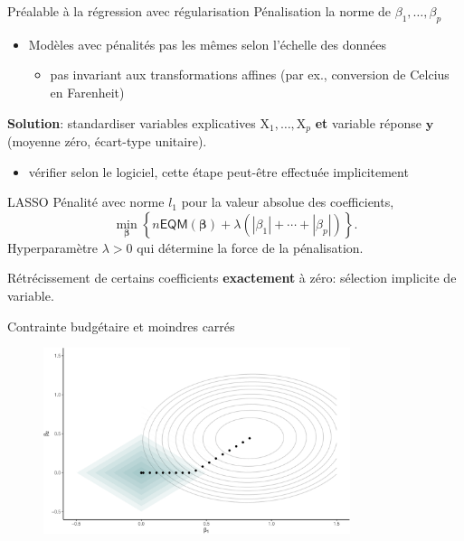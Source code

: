 \documentclass[
  ignorenonframetext,
]{beamer}
\providecommand{\tightlist}{%
  \setlength{\itemsep}{0pt}\setlength{\parskip}{0pt}}\usepackage{longtable,booktabs,array}
\begin{document}
\begin{frame}{Préalable à la régression avec régularisation}
\protect\hypertarget{pruxe9alable-uxe0-la-ruxe9gression-avec-ruxe9gularisation}{}
Pénalisation la norme de \(\beta_1, \ldots, \beta_p\)

\begin{itemize}
\tightlist
\item
  Modèles avec pénalités pas les mêmes selon l'échelle des données

  \begin{itemize}
  \tightlist
  \item
    pas invariant aux transformations affines (par ex., conversion de
    Celcius en Farenheit)
  \end{itemize}
\end{itemize}

\textbf{Solution}: standardiser variables explicatives
\(\mathrm{X}_1, \ldots, \mathrm{X}_p\) \textbf{et} variable réponse
\(\boldsymbol{y}\) (moyenne zéro, écart-type unitaire).

\begin{itemize}
\tightlist
\item
  vérifier selon le logiciel, cette étape peut-être effectuée
  implicitement
\end{itemize}
\end{frame}

\begin{frame}{LASSO}
\protect\hypertarget{lasso}{}
Pénalité avec norme \(l_1\) pour la valeur absolue des coefficients,
\[ \min_{\boldsymbol{\beta}} \left\{ n\mathsf{EQM}(\boldsymbol{\beta}) + \lambda(|\beta_1| + \cdots + |\beta_p|)\right\}.\]
Hyperparamètre \(\lambda>0\) qui détermine la force de la pénalisation.

Rétrécissement de certains coefficients \textbf{exactement} à zéro:
sélection implicite de variable.
\end{frame}

\begin{frame}{Contrainte budgétaire et moindres carrés}
\protect\hypertarget{contrainte-budguxe9taire-et-moindres-carruxe9s}{}
\begin{figure}

{\centering \includegraphics[width=0.8\textwidth,height=\textheight]{figures/fig-lassopenalty.pdf}

}

\end{figure}
\end{frame}
\end{document}
